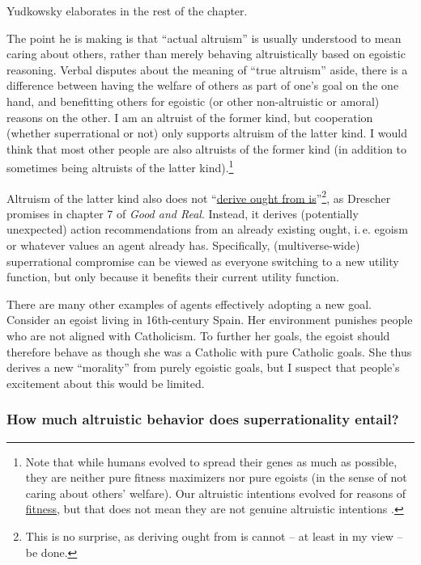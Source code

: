 Yudkowsky elaborates in the rest of the chapter.

The point he is making is that ``actual altruism'' is usually understood
to mean caring about others, rather than merely behaving altruistically
based on egoistic reasoning. Verbal disputes about the meaning of ``true
altruism'' aside, there is a difference between having the welfare of
others as part of one's goal on the one hand, and benefitting others for
egoistic (or other non-altruistic or amoral) reasons on the other. I am
an altruist of the former kind, but cooperation (whether superrational
or not) only supports altruism of the latter kind. I would think that
most other people are also altruists of the former kind (in addition to
sometimes being altruists of the latter kind).\footnote{Note that while
  humans evolved to spread their genes as much as possible, they are
  neither pure fitness maximizers nor pure egoists (in the sense of not
  caring about others' welfare). Our altruistic intentions evolved for
  reasons of
  \href{https://en.wikipedia.org/wiki/Fitness_\%28biology\%29}{fitness},
  but that does not mean they are not genuine altruistic intentions
  \parencite{Yudkowsky2015-tz,Cosmides1995-bz,Wright1995-po}.}

Altruism of the latter kind also does not
``\href{https://en.wikipedia.org/wiki/Is\%E2\%80\%93ought_problem}{derive
ought from is}''\footnote{This is no surprise, as
  deriving ought from is cannot -- at least in my view -- be done.}, as
Drescher promises in chapter 7 of \emph{Good and Real}. Instead, it
derives (potentially unexpected) action recommendations from an already
existing ought, i.\,e. egoism or whatever values an agent already has.
Specifically, (multiverse-wide) superrational compromise can be viewed
as everyone switching to a new utility function, but only because it
benefits their current utility function.

There are many other examples of agents effectively adopting a new goal.
Consider an egoist living in 16th-century Spain. Her environment
punishes people who are not aligned with Catholicism. To further her
goals, the egoist should therefore behave as though she was a Catholic
with pure Catholic goals. She thus derives a new ``morality'' from
purely egoistic goals, but I suspect that people's excitement about this
would be limited.

\subsubsection{How much altruistic behavior does superrationality
entail?}\label{how-much-altruistic-behavior-does-superrationality-entail}

